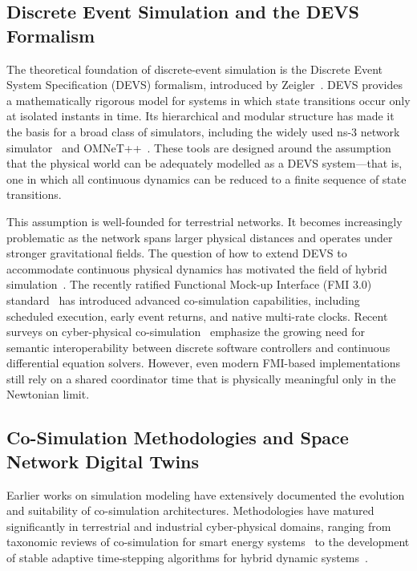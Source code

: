 \documentclass[a4paper,fleqn]{cas-sc}
\begin{document}
\subsection{Discrete Event Simulation and the DEVS Formalism}
The theoretical foundation of discrete-event simulation is the Discrete Event System Specification (DEVS) formalism, introduced by Zeigler~\cite{zeigler2000}. DEVS provides a mathematically rigorous model for systems in which state transitions occur only at isolated instants in time. Its hierarchical and modular structure has made it the basis for a broad class of simulators, including the widely used ns-3 network simulator~\cite{ns3} and OMNeT++~\cite{omnet}. These tools are designed around the assumption that the physical world can be adequately modelled as a DEVS system---that is, one in which all continuous dynamics can be reduced to a finite sequence of state transitions.

This assumption is well-founded for terrestrial networks. It becomes increasingly problematic as the network spans larger physical distances and operates under stronger gravitational fields. The question of how to extend DEVS to accommodate continuous physical dynamics has motivated the field of hybrid simulation~\cite{hybrid_sim_review}. {\color{revcolor}The recently ratified Functional Mock-up Interface (FMI 3.0) standard~\cite{fmi3_standard} has introduced advanced co-simulation capabilities, including scheduled execution, early event returns, and native multi-rate clocks. Recent surveys on cyber-physical co-simulation~\cite{gomes_cosim_survey_2018} emphasize the growing need for semantic interoperability between discrete software controllers and continuous differential equation solvers. However, even modern FMI-based implementations still rely on a shared coordinator time that is physically meaningful only in the Newtonian limit.}

\subsection{Co-Simulation Methodologies and Space Network Digital Twins}
Earlier works on simulation modeling have extensively documented the evolution and suitability of co-simulation architectures. Methodologies have matured significantly in terrestrial and industrial cyber-physical domains, ranging from taxonomic reviews of co-simulation for smart energy systems~\cite{simpat_taxonomic} to the development of stable adaptive time-stepping algorithms for hybrid dynamic systems~\cite{simpat_adaptive, simpat_multirate}. 
\end{document}
